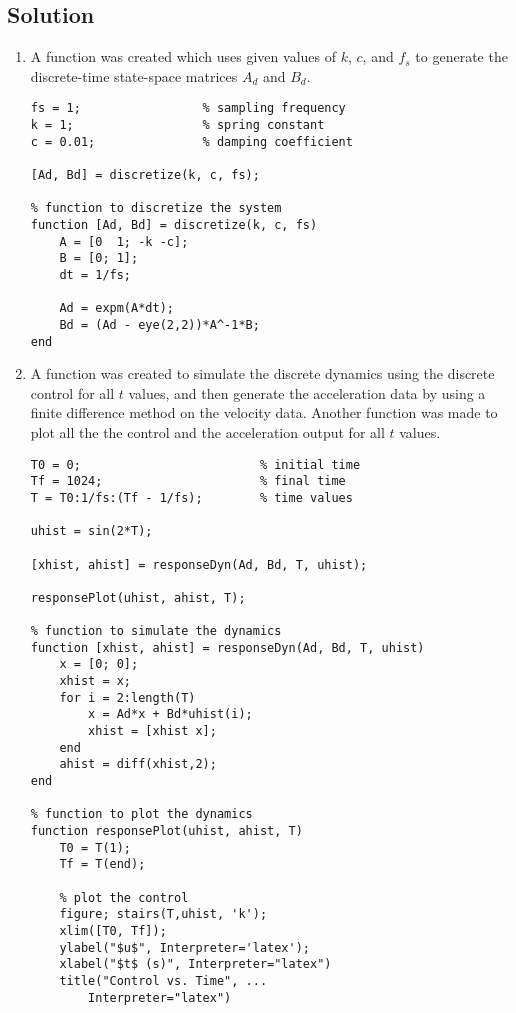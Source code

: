 \documentclass{article}
\begin{document}
\subsection{Solution}
\begin{enumerate}
    \item A function was created which uses given values of $k$, $c$, and $f_s$ to generate the discrete-time state-space matrices $A_d$ and $B_d$.


    \begin{lstlisting}[style=Matlab-editor]
fs = 1;                 % sampling frequency
k = 1;                  % spring constant
c = 0.01;               % damping coefficient

[Ad, Bd] = discretize(k, c, fs);

% function to discretize the system
function [Ad, Bd] = discretize(k, c, fs)
    A = [0  1; -k -c];
    B = [0; 1];
    dt = 1/fs;
    
    Ad = expm(A*dt);
    Bd = (Ad - eye(2,2))*A^-1*B;
end
    \end{lstlisting}

    \item A function was created to simulate the discrete dynamics using the discrete control for all $t$ values, and then generate the acceleration data by using a finite difference method on the velocity data. Another function was made to plot all the the control and the acceleration output for all $t$ values.

        \begin{lstlisting}[style=Matlab-editor]
T0 = 0;                         % initial time
Tf = 1024;                      % final time
T = T0:1/fs:(Tf - 1/fs);        % time values

uhist = sin(2*T);

[xhist, ahist] = responseDyn(Ad, Bd, T, uhist);

responsePlot(uhist, ahist, T);

% function to simulate the dynamics
function [xhist, ahist] = responseDyn(Ad, Bd, T, uhist)
    x = [0; 0];
    xhist = x;
    for i = 2:length(T)
        x = Ad*x + Bd*uhist(i);
        xhist = [xhist x];
    end
    ahist = diff(xhist,2);
end

% function to plot the dynamics
function responsePlot(uhist, ahist, T)
    T0 = T(1);
    Tf = T(end);
    
    % plot the control
    figure; stairs(T,uhist, 'k'); 
    xlim([T0, Tf]);
    ylabel("$u$", Interpreter='latex');
    xlabel("$t$ (s)", Interpreter="latex")
    title("Control vs. Time", ...
        Interpreter="latex")
    

\end{lstlisting}
\end{enumerate}
\end{document}
